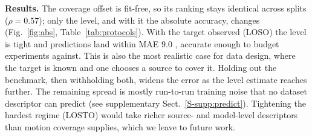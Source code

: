 \noindent\textbf{Results.} The coverage offset is fit-free, so its ranking stays
identical across splits ($\rho{=}0.57$); only the level, and with it the absolute
accuracy, changes (Fig.~\ref{fig:abs}, Table~\ref{tab:protocols}). With the target
observed (LOSO) the level is tight and predictions land within MAE $9.0$ \pck{},
accurate enough to budget experiments against. This is also the most realistic case
for data design, where the target is known and one chooses a source to cover it.
Holding out the benchmark, then withholding both, widens the error as the level estimate reaches
further. The remaining spread is mostly
run-to-run training noise that no dataset descriptor can predict (see supplementary Sect.~\ref{S-supp:predict}). Tightening
the hardest regime (LOSTO) would take richer source- and model-level descriptors than motion coverage supplies, which we leave to future work.

